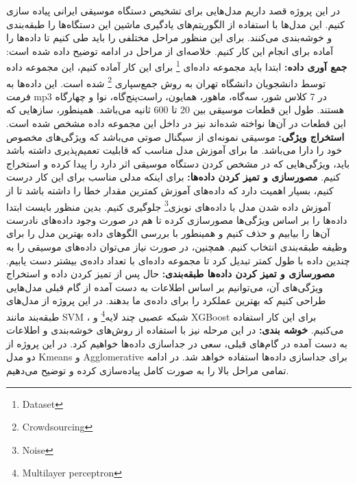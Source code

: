 \documentclass{article}
\begin{document}
در این پروژه قصد داریم مدل‌هایی برای تشخیص دستگاه موسیقی ایرانی پیاده سازی کنیم.  این مدل‌ها با استفاده از الگوریتم‌های یادگیری ماشین این دستگاه‌ها را طبقه‌بندی و خوشه‌بندی می‌کنند. برای این منظور مراحل مختلفی را باید طی کنیم تا داده‌ها را آماده برای انجام این کار کنیم. خلاصه‌ای از مراحل در ادامه توضیح داده شده است:  \newline
\textbf{جمع آوری داده:} 
\newline
ابتدا باید مجموعه داده‌ای \footnote{Dataset} برای این کار آماده کنیم، این مجموعه داده توسط دانشجویان دانشگاه تهران به روش جمع‌سپاری \footnote{Crowdsourcing} شده است. این داده‌ها به  فرمت mp3 در 7 کلاس شور، سه‌گاه، ماهور، همایون، راست‌پنج‌گاه، نوا و چهارگاه هستند. طول این قطعات موسیقی بین 20 تا 600 ثانیه می‌باشد. همینطور، ساز‌هایی که این قطعات در آن‌ها نواخته شده‌اند نیز در داخل این مجموعه داده مشخص شده است.\newline
\textbf{استخراج ویژگی:} \newline
موسیقی نمونه‌ای از سیگنال صوتی می‌باشد که ویژگی‌های مخصوص خود را دارا می‌باشد. ما برای آموزش مدل مناسب که قابلیت تعمیم‌پذیری داشته باشد باید، ویژگی‌هایی که در مشخص کردن دستگاه موسیقی اثر دارد را پیدا کرده و استخراج کنیم.\newline
\textbf{مصور‌سازی و تمیز کردن داده‌ها:} \newline
برای اینکه مدلی مناسب برای این کار درست کنیم، بسیار اهمیت دارد که داده‌های آموزش کمترین مقدار خطا را داشته باشد تا از آموزش داده شدن مدل با داده‌های نویزی\footnote{Noise} جلوگیری کنیم. بدین منظور بایست ابتدا داده‌ها را بر اساس ویژگی‌ها مصور‌سازی کرده تا هم در صورت وجود داده‌های نادرست آن‌ها را بیابیم و حذف کنیم و همینطور با بررسی الگوهای داده بهترین مدل را برای وظیفه طبقه‌بندی انتخاب کنیم. همچنین، در صورت نیاز می‌توان داده‌های موسیقی را به چندین داده با طول کمتر تبدیل کرد تا مجموعه داده‌ای با تعداد داده‌ی بیشتر دست یابیم.\newline
\textbf{مصور‌سازی و تمیز کردن داده‌ها طبقه‌بندی:} \newline
حال پس از تمیز کردن داده‌ و استخراج ویژگی‌های آن، می‌توانیم بر اساس اطلاعات به دست آمده از گام قبلی مدل‌هایی طراحی کنیم که بهترین عملکرد را برای داده‌ی ما بدهند. در این پروژه از مدل‌های طبقه‌بند مانند SVM ،  شبکه عصبی چند لایه\footnote{Multilayer perceptron} و XGBoost برای این کار استفاده می‌کنیم.\newline
\textbf{خوشه بندی:} \newline
در این مرحله نیز با استفاده از روش‌های خوشه‌بندی و اطلاعات به دست آمده در گام‌های قبلی، سعی در جداسازی داده‌ها خواهیم کرد. در این پروژه از دو مدل Kmeans و Agglomerative برای جداسازی داده‌ها استفاده خواهد شد.\newline
در ادامه تمامی مراحل بالا را به صورت کامل پیاده‌سازی کرده و توضیح می‌دهیم.
\newpage
\end{document}
